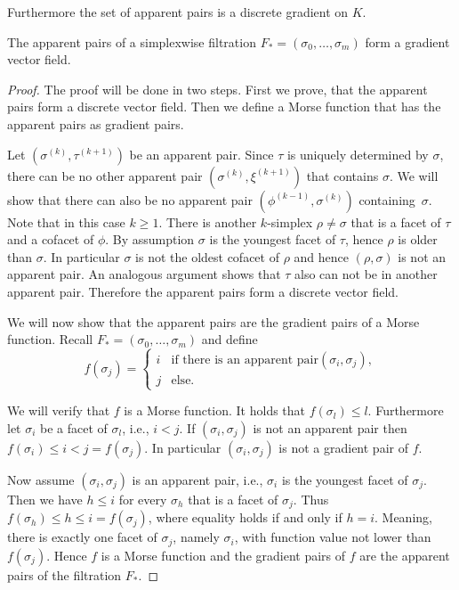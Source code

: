 Furthermore the set of apparent pairs is a discrete gradient on $K$.

\begin{lemma}
The apparent pairs of a simplexwise filtration $F_* = (\sigma_0, \dots, \sigma_m)$ form a gradient vector field.
\label{lemma:apparent_pairs_form_gradient}
\end{lemma}
\begin{proof}
The proof will be done in two steps. First we prove, that the apparent pairs form a discrete vector field. Then we define a Morse function that has the apparent pairs as gradient pairs. 

Let $(\sigma^{(k)}, \tau^{(k+1)})$ be an apparent pair. Since $\tau$ is uniquely determined by $\sigma$, there can be no other apparent pair $(\sigma^{(k)}, \xi^{(k+1)})$ that contains $\sigma$. We will show that there can also be no apparent pair $(\phi^{(k-1)},\sigma^{(k)})$ containing~$\sigma$. Note that in this case $k \geq 1$. There is another $k$-simplex $\rho \neq \sigma$ that is a facet of $\tau$ and a cofacet of $\phi$. By assumption $\sigma$ is the youngest facet of $\tau$, hence $\rho$ is older than $\sigma$. In particular $\sigma$ is not the oldest cofacet of $\rho$ and hence $(\rho,\sigma)$ is not an apparent pair. 
An analogous argument shows that $\tau$ also can not be in another apparent pair. Therefore the apparent pairs form a discrete vector field. 

We will now show that the apparent pairs are the gradient pairs of a Morse function. Recall $F_* = (\sigma_0, \dots, \sigma_m)$ and define
\[
f(\sigma_j)= \begin{cases} 
      i & \text{if there is an apparent pair$(\sigma_i,\sigma_j)$}, \\
      j & \text{else.} 
   \end{cases}
\]

We will verify that $f$ is a Morse function. It holds that $f(\sigma_l) \leq l$. Furthermore let $\sigma_i$ be a facet of $\sigma_l$, i.e., $i<j$. If $(\sigma_i, \sigma_j)$ is not an apparent pair then $f(\sigma_i)\leq i < j = f(\sigma_j)$. In particular $(\sigma_i, \sigma_j)$ is not a gradient pair of $f$. 

Now assume $(\sigma_i, \sigma_j)$ is an apparent pair, i.e., $\sigma_i$ is the youngest facet of $\sigma_j$. Then we have $h \leq i$ for every $\sigma_h$ that is a facet of $\sigma_j$. Thus $f(\sigma_h) \leq h \leq i = f(\sigma_j)$, where equality holds if and only if $h = i$. Meaning, there is exactly one facet of $\sigma_j$, namely $\sigma_i$, with function value not lower than $f(\sigma_j)$. Hence $f$ is a Morse function and the gradient pairs of $f$ are the apparent pairs of the filtration $F_*$.

\end{proof}

